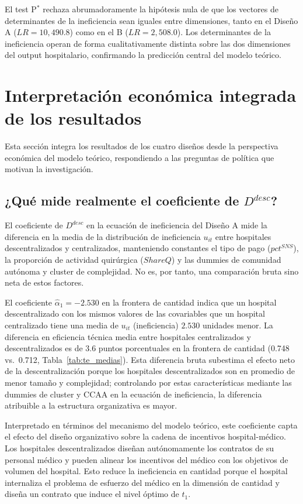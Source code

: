 \documentclass[12pt, a4paper, twoside, openright]{book}
\theoremstyle{plain}
\theoremstyle{definition}
\theoremstyle{remark}
\begin{document}
El test P$^*$ rechaza abrumadoramente la hipótesis nula de que los vectores de determinantes de la ineficiencia sean iguales entre dimensiones, tanto en el Diseño A ($LR=10{,}490.8$) como en el B ($LR=2{,}508.0$). Los determinantes de la ineficiencia operan de forma cualitativamente distinta sobre las dos dimensiones del output hospitalario, confirmando la predicción central del modelo teórico.

\section{Interpretación económica integrada de los resultados}
\label{sec:interpretacion_economica_integ}

Esta sección integra los resultados de los cuatro diseños desde la perspectiva económica del modelo teórico, respondiendo a las preguntas de política que motivan la investigación.

\subsection{¿Qué mide realmente el coeficiente de \texorpdfstring{$D^{desc}$}{D\^{}desc}?}

El coeficiente de $D^{desc}$ en la ecuación de ineficiencia del Diseño A mide la diferencia en la media de la distribución de ineficiencia $u_{it}$ entre hospitales descentralizados y centralizados, manteniendo constantes el tipo de pago ($pct^{SNS}$), la proporción de actividad quirúrgica ($ShareQ$) y las dummies de comunidad autónoma y cluster de complejidad. No es, por tanto, una comparación bruta sino neta de estos factores.

El coeficiente $\hat{\alpha}_1 = -2.530$ en la frontera de cantidad indica que un hospital descentralizado con los mismos valores de las covariables que un hospital centralizado tiene una media de $u_{it}$ (ineficiencia) $2.530$ unidades menor. La diferencia en eficiencia técnica media entre hospitales centralizados y descentralizados es de 3.6 puntos porcentuales en la frontera de cantidad (0.748 vs.\ 0.712, Tabla~\ref{tab:te_medias}). Esta diferencia bruta subestima el efecto neto de la descentralización porque los hospitales descentralizados son en promedio de menor tamaño y complejidad; controlando por estas características mediante las dummies de cluster y CCAA en la ecuación de ineficiencia, la diferencia atribuible a la estructura organizativa es mayor.

Interpretado en términos del mecanismo del modelo teórico, este coeficiente capta el efecto del diseño organizativo sobre la cadena de incentivos hospital-médico. Los hospitales descentralizados diseñan autónomamente los contratos de su personal médico y pueden alinear los incentivos del médico con los objetivos de volumen del hospital. Esto reduce la ineficiencia en cantidad porque el hospital internaliza el problema de esfuerzo del médico en la dimensión de cantidad y diseña un contrato que induce el nivel óptimo de $t_1$.
\end{document}
